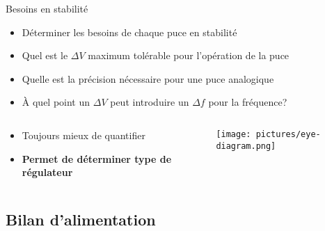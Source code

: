 \begin{frame}{Besoins en stabilité}
    \begin{itemize}
        \item Déterminer les besoins de chaque puce en stabilité
        \item Quel est le $\Delta V$ maximum tolérable pour l'opération de la puce
        \item Quelle est la précision nécessaire pour une puce analogique
        \item À quel point un $\Delta V$ peut introduire un $\Delta f$ pour la fréquence?
    \end{itemize}

    \begin{columns}
        \begin{column}{0.5\textwidth}
             {
            \begin{itemize}
                \item Toujours mieux de quantifier
                \item \textbf{Permet de déterminer type de régulateur}
            \end{itemize}
            }
        \end{column}
        \begin{column}{0.5\textwidth}
            \begin{figure}
                \texttt{[image: pictures/eye-diagram.png]}
            \end{figure}
        \end{column}
    \end{columns}
\end{frame}


\subsection{Bilan d'alimentation}

